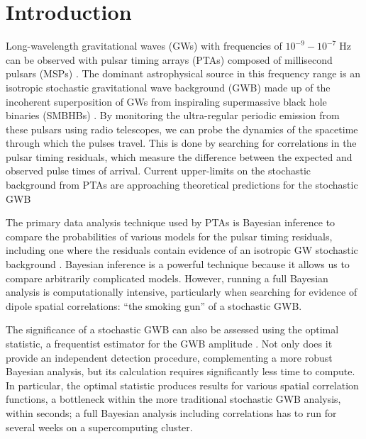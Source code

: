\documentclass[twocolumn,aps,prd,superscriptaddress]{revtex4-1}
\begin{document}
\maketitle


\section{Introduction}

Long-wavelength gravitational waves (GWs) with frequencies of 
$10^{-9} - 10^{-7} \; \mathrm{Hz}$ can be observed with pulsar timing arrays (PTAs) 
composed of millisecond pulsars (MSPs) \cite{hd1983,fb1990}. 
The dominant astrophysical source in this frequency range is an isotropic stochastic 
gravitational wave background (GWB) 
made up of the incoherent superposition of GWs from inspiraling 
supermassive black hole binaries (SMBHBs) 
\citep{1995ApJ...446..543R, 2003ApJ...583..616J, 2003ApJ...590..691W}. 
By monitoring the ultra-regular periodic emission from these pulsars using radio telescopes, 
we can probe the dynamics of the spacetime through which the pulses travel. 
This is done by searching for correlations in the pulsar timing residuals, 
which measure the difference between the expected and observed pulse times of arrival. 
Current upper-limits on the stochastic background from PTAs are approaching 
theoretical predictions for the stochastic GWB \citep{PPTA2013,EPTA2015,abb+17b}

The primary data analysis technique used by PTAs is Bayesian inference 
to compare the probabilities of various models for the pulsar timing residuals, 
including one where the residuals contain evidence of an isotropic GW stochastic background 
\citep{vlm+2009,lah+2013}. 
Bayesian inference is a powerful technique because it allows us to compare arbitrarily complicated models. 
However, running a full Bayesian analysis is computationally intensive, 
particularly when searching for evidence of dipole spatial correlations:
``the smoking gun'' of a stochastic GWB.

The significance of a stochastic GWB can also be assessed using the 
optimal statistic, a frequentist estimator for the GWB amplitude \citep{abc+2009,demorest+2013,ccs+2015}. 
Not only does it provide an independent detection procedure, complementing a more robust Bayesian analysis, but its calculation requires significantly less time to compute. In particular, the optimal statistic produces results for various spatial correlation functions, a bottleneck within the more traditional stochastic GWB analysis, within seconds; a full Bayesian analysis including correlations has to run for several weeks on a supercomputing cluster. 
\end{document}
